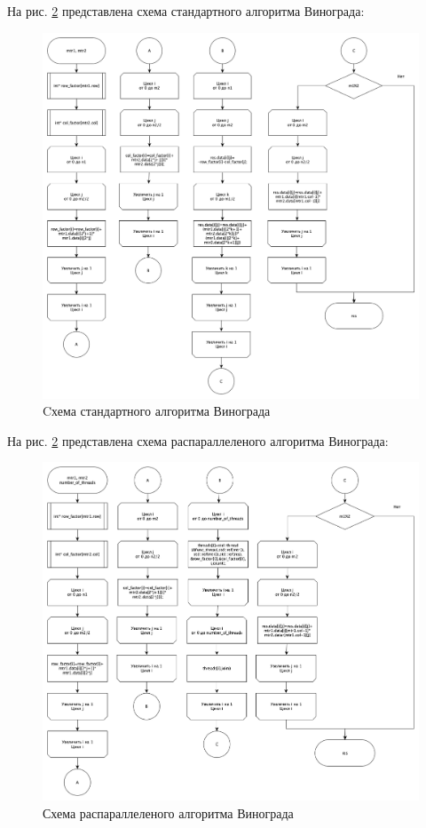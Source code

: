 \documentclass[12pt]{report}
\begin{document}
На рис. \ref{fig:def} представлена  схема стандартного алгоритма Винограда:
	\begin{figure}[h]
        	\begin{center}
        		\includegraphics[scale=0.32]{standart_vinograd2}
        		\caption{Cхема стандартного алгоритма Винограда}
        		\label{fig:def}
        	\end{center}
        \end{figure}
        
На рис. \ref{fig:def} представлена схема распараллеленого алгоритма Винограда:
	\begin{figure}[h]
        	\begin{center}
        		\includegraphics[scale=0.32]{parallel_vinograd2}
        		\caption{Схема распараллеленого алгоритма Винограда}
        		\label{fig:def}
        	\end{center}
        \end{figure}
        
\end{document}
